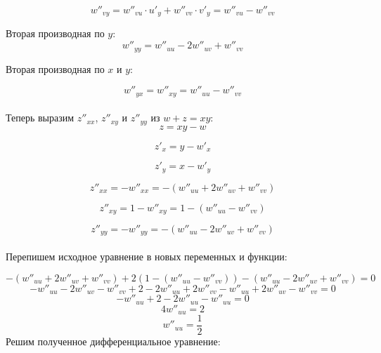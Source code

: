 \documentclass[a5paper, 10pt]{article}
\theoremstyle{definition}
\theoremstyle{plain}
\theoremstyle{remark}
\begin{document}
\begin{equation}
w''_{vy}  = w''_{vu} \cdot u'_y + w''_{vv} \cdot v'_y = w''_{vu} - w''_{vv}
\end{equation}

 Вторая производная по $y$:
\begin{equation}
w''_{yy} = w''_{uu} - 2w''_{uv} + w''_{vv}
\end{equation}

Вторая производная по  $x$ и $y$:

\begin{equation}
w''_{yx} = w''_{xy} =  w''_{uu} -  w''_{vv}
\end{equation}
\\
Теперь выразим $z''_{xx}$,  $z''_{xy}$ и $z''_{yy}$ из $w + z = xy$:
\begin{equation}
z = xy - w
\end{equation}

\begin{equation}
z'_x = y - w'_x
\end{equation}

\begin{equation}
z'_y = x - w'_y
\end{equation}

\begin{equation}
z''_{xx} = - w''_{xx} = - ( w''_{uu} + 2w''_{uv} + w''_{vv})
\end{equation}


\begin{equation}
z''_{xy} = 1 - w''_{xy} = 1 - ( w''_{uu} -  w''_{vv})
\end{equation}

\begin{equation}
z''_{yy} = - w''_{yy} = -( w''_{uu} - 2w''_{uv} + w''_{vv})
\end{equation}
\\
Перепишем исходное уравнение в новых переменных и функции:

\begin{equation}
- ( w''_{uu} + 2w''_{uv} + w''_{vv}) + 2 (1 - ( w''_{uu} -  w''_{vv})) -( w''_{uu} - 2w''_{uv} + w''_{vv}) = 0
\end{equation}
\begin{equation}
- w''_{uu} - 2w''_{uv} - w''_{vv} + 2 -2  w''_{uu} +2  w''_{vv} - w''_{uu} + 2w''_{uv} - w''_{vv} = 0
\end{equation}
\begin{equation}
- w''_{uu}  + 2 -2  w''_{uu}  - w''_{uu}   = 0
\end{equation}
\begin{equation}
4 w''_{uu}  = 2
\end{equation}
\begin{equation}
 w''_{uu}  = \frac{1}{2}
\end{equation}
Решим полученное дифференциальное уравнение:
\end{document}
